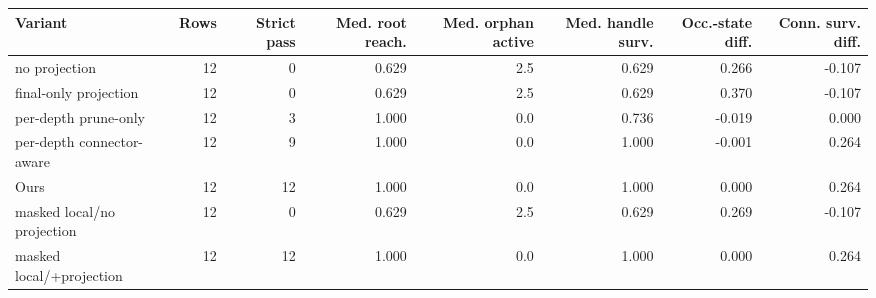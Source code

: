 \begin{tabular}{lrrrrrrr}
\toprule
Variant & Rows & Strict pass & Med. root reach. & Med. orphan active & Med. handle surv. & Occ.-state diff. & Conn. surv. diff. \\
\midrule
no projection & 12 & 0 & 0.629 & 2.5 & 0.629 & 0.266 & -0.107 \\
final-only projection & 12 & 0 & 0.629 & 2.5 & 0.629 & 0.370 & -0.107 \\
per-depth prune-only & 12 & 3 & 1.000 & 0.0 & 0.736 & -0.019 & 0.000 \\
per-depth connector-aware & 12 & 9 & 1.000 & 0.0 & 1.000 & -0.001 & 0.264 \\
Ours & 12 & 12 & 1.000 & 0.0 & 1.000 & 0.000 & 0.264 \\
masked local/no projection & 12 & 0 & 0.629 & 2.5 & 0.629 & 0.269 & -0.107 \\
masked local/+projection & 12 & 12 & 1.000 & 0.0 & 1.000 & 0.000 & 0.264 \\
\bottomrule
\end{tabular}
